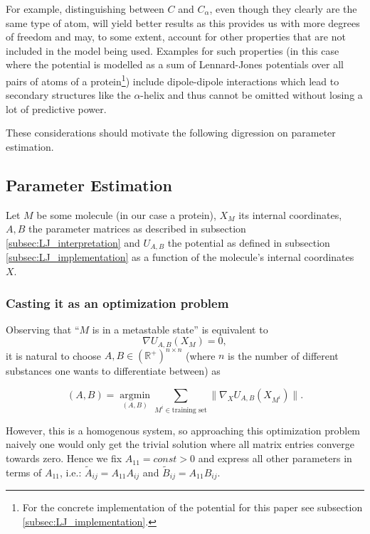\documentclass[12pt]{article}
\theoremstyle{definition}\newtheorem*{definition}{Definition}
\theoremstyle{definition}\newtheorem*{remark}{Remark}
\begin{document}
For example, distinguishing between $C$ and $C_\alpha$, even though they clearly are the same type of atom, will yield better results as this provides us with more degrees of freedom and may, to some extent, account for other properties that are not included in the model being used. Examples for such properties (in this case where the potential is modelled as a sum of Lennard-Jones potentials over all pairs of atoms of a protein\footnote{For the concrete implementation of the potential for this paper see subsection \ref{subsec:LJ_implementation}.}) include dipole-dipole interactions which lead to secondary structures like the $\alpha$-helix and thus cannot be omitted without losing a lot of predictive power.

These considerations should motivate the following digression on parameter estimation.


\subsection{Parameter Estimation}\label{subsec:LJ_paramestimation}
Let $M$ be some molecule (in our case a protein), $X_M$ its internal coordinates, $A,B$ the parameter matrices as described in subsection \ref{subsec:LJ_interpretation} and $U_{A,B}$ the potential as defined in subsection \ref{subsec:LJ_implementation} as a function of the molecule's internal coordinates $X$.

\subsubsection{Casting it as an optimization problem}

Observing that ``$M$ is in a metastable state'' is equivalent to $$\nabla U_{A,B}(X_M)=0,$$
it is natural to choose $A,B \in (\mathbb R^+)^{n\times n}$ (where $n$ is the number of different substances one wants to differentiate between) as

\begin{equation}\label{eq:param_estimation}
	(A,B)=\underset{(A,B)}{\operatorname{argmin}} \sum_{M^i\in\text{training set}}\|\nabla_X U_{A,B}(X_{M^i})\|.
\end{equation}

However, this is a homogenous system, so approaching this optimization problem naively one would only get the trivial solution where all matrix entries converge towards zero. Hence we fix $A_{11} = \textit{const} > 0$ and express all other parameters in terms of $A_{11}$, i.e.: $\tilde A_{ij} = A_{11}A_{ij}$ and $\tilde B_{ij} = A_{11}B_{ij}$.
\end{document}
